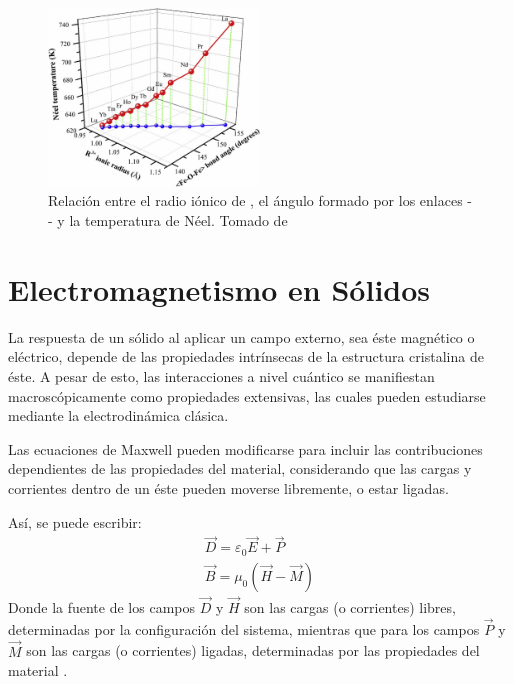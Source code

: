 \documentclass[../main.tex]{subfiles}
\begin{document}
\begin{figure}[H]
    \centering
    \includegraphics[width=0.5\textwidth]{fig/neelradio.jpg}
    \caption{Relación entre el radio iónico de , el ángulo formado por los enlaces -- y la temperatura de Néel. Tomado de \cite{Wang2019}}
    \label{fig:neelradio}
\end{figure}

\section{Electromagnetismo en Sólidos}
La respuesta de un sólido al aplicar un campo externo, sea éste magnético o eléctrico, depende de las propiedades intrínsecas de la estructura cristalina de éste. A pesar de esto, las interacciones a nivel cuántico se manifiestan macroscópicamente como propiedades extensivas, las cuales pueden estudiarse mediante la electrodinámica clásica.

Las ecuaciones de Maxwell pueden modificarse para incluir las contribuciones dependientes de las propiedades del material, considerando que las cargas y corrientes dentro de un éste pueden moverse libremente, o estar ligadas.

Así, se puede escribir:
\begin{equation}
    \begin{split}
        \vec{D}=\varepsilon_0\vec{E}+\vec{P}\\
        \vec{B}=\mu_0(\vec{H}-\vec{M})
    \end{split}  
    \label{eq:maxwellmacro}
\end{equation}
Donde la fuente de los campos $\vec{D}$ y $\vec{H}$ son las cargas (o corrientes) libres, determinadas por la configuración del sistema, mientras que para los campos $\vec{P}$ y $\vec{M}$ son las cargas (o corrientes) ligadas, determinadas por las propiedades del material \cite{griffiths2023introduction}.
\end{document}
